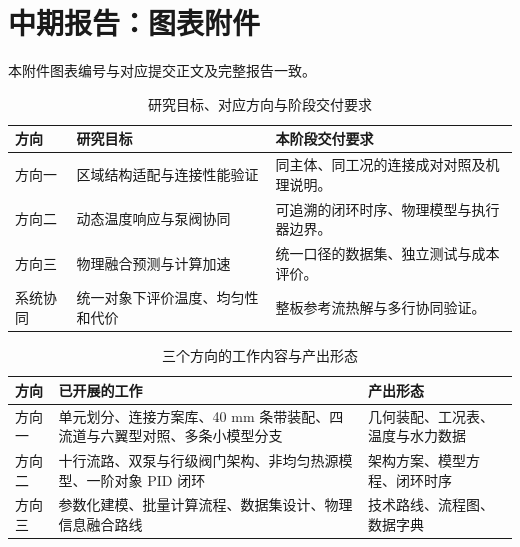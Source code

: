 \documentclass[UTF8]{midterm}
\begin{document}
\section*{中期报告：图表附件}
本附件图表编号与对应提交正文及完整报告一致。\par\clearpage
\setcounter{section}{1}
\setcounter{figure}{0}
\clearpage
\setcounter{section}{1}
\setcounter{figure}{1}
\clearpage
\setcounter{section}{1}
\setcounter{table}{0}
\begin{table}[!htbp]
\centering\small
\caption{研究目标、对应方向与阶段交付要求}\label{tab:01}
\begin{tabularx}{\linewidth}{lYY}
\toprule
{} 方向 & 研究目标 & 本阶段交付要求 \\
\midrule
方向一 & 区域结构适配与连接性能验证 & 同主体、同工况的连接成对对照及机理说明。 \\
方向二 & 动态温度响应与泵阀协同 & 可追溯的闭环时序、物理模型与执行器边界。 \\
方向三 & 物理融合预测与计算加速 & 统一口径的数据集、独立测试与成本评价。 \\
系统协同 & 统一对象下评价温度、均匀性和代价 & 整板参考流热解与多行协同验证。 \\
\bottomrule
\end{tabularx}
\end{table}
\clearpage
\setcounter{section}{1}
\setcounter{figure}{2}
\clearpage
\setcounter{section}{1}
\setcounter{table}{1}
\begin{table}[!htbp]
\centering\small
\caption{三个方向的工作内容与产出形态}\label{tab:work}
\begin{tabularx}{\linewidth}{@{}lYY@{}}
\toprule
{} 方向 & 已开展的工作 & 产出形态 \\
\midrule
方向一 & 单元划分、连接方案库、40 mm 条带装配、四流道与六翼型对照、多条小模型分支 & 几何装配、工况表、温度与水力数据 \\
方向二 & 十行流路、双泵与行级阀门架构、非均匀热源模型、一阶对象 PID 闭环 & 架构方案、模型方程、闭环时序 \\
方向三 & 参数化建模、批量计算流程、数据集设计、物理信息融合路线 & 技术路线、流程图、数据字典 \\
\bottomrule
\end{tabularx}
\end{table}
\end{document}
